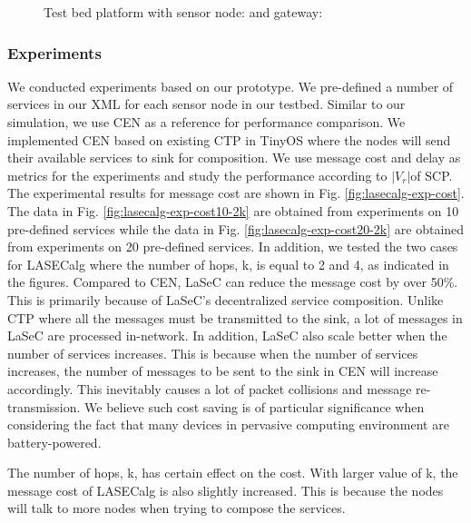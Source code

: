 \begin{figure}
\centering
{}
\qquad
{}
\caption{Test bed platform with sensor node:  and gateway: }
\label{fig:lasecalg-implementation-hardware}
\end{figure}

\subsubsection{Experiments}
We conducted experiments based on our prototype.  We pre-defined a number of services in our XML for each sensor node in our testbed. Similar to our simulation, we use CEN as a reference for performance comparison. We implemented CEN based on existing CTP in TinyOS where the nodes will send their available services to sink for composition. We use message cost and delay as metrics for the experiments and study the performance according to \(|V_r |\)of SCP. The experimental results for message cost are shown in Fig. \ref{fig:lasecalg-exp-cost}. The data in Fig. \ref{fig:lasecalg-exp-cost10-2k} are obtained from experiments on 10 pre-defined services while the data in Fig. \ref{fig:lasecalg-exp-cost20-2k} are obtained from experiments on 20 pre-defined services. In addition, we tested the two cases for LASECalg where the number of hops, k, is equal to 2 and 4, as indicated in the figures. Compared to CEN, LaSeC can reduce the message cost by over 50\%. This is primarily because of LaSeC's decentralized service composition. Unlike CTP where all the messages must be transmitted to the sink, a lot of messages in LaSeC are processed in-network. In addition, LaSeC also scale better when the number of services increases. This is because when the number of services increases, the number of messages to be sent to the sink in CEN will increase accordingly. This inevitably causes a lot of packet collisions and message re-transmission.  We believe such cost saving is of particular significance when considering the fact that many devices in pervasive computing environment are battery-powered.

The number of hops, k, has certain effect on the cost. With larger value of k, the message cost of LASECalg is also slightly increased. This is because the nodes will talk to more nodes when trying to compose the services.

